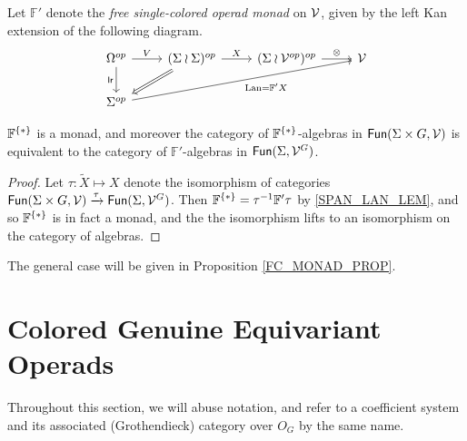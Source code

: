 \documentclass[a4paper,10pt
]{article}%
\renewcommand{\1}{\ensuremath{\mathbb{id}}}
\begin{document}
\begin{notation}[\cite{BP17}]
      Let $\mathbb F'$ denote the \textit{free single-colored operad monad} on $\mathcal V$, given by the left Kan extension of the following diagram.
      \begin{equation}
            \begin{tikzcd}
                  \Omega^{op}
                  \arrow[d, "\mathsf{lr}"']
                  \arrow[r, "V"]
                  &
                  (\Sigma \wr \Sigma)^{op} \arrow[r, "X"]
                  \arrow[dl, Rightarrow]
                  &
                  (\Sigma \wr \V^{op})^{op} \arrow[r, "\otimes"]
                  &
                  \V
                  \\
                  \Sigma^{op} \arrow[urrr, "\Lan = \mathbb F' X"']
            \end{tikzcd}
      \end{equation}
\end{notation}

\begin{proposition}
      \label{TEST_PROP}
      $\mathbb F^{\set{\**}}$ is a monad, and moreover
      the category of $\mathbb F^{\set{\**}}$-algebras in $\mathsf{Fun}(\Sigma \times G, \mathcal V)$ is equivalent to
      the category of $\mathbb F'$-algebras in $\mathsf{Fun}(\Sigma, \mathcal V^G)$.
\end{proposition}
\begin{proof}
      Let $\tau: \tilde X \mapsto X$ denote the isomorphism of categories
      $\mathsf{Fun}(\Sigma \times G, \mathcal V) \xrightarrow{\tau} \mathsf{Fun}(\Sigma, \mathcal V^G)$.
      Then $\mathbb F^{\set{\**}} = \tau^{-1} \mathbb F' \tau$ by \ref{SPAN_LAN_LEM}, and so
      $\mathbb F^{\set{\**}}$ is in fact a monad, and the
      the isomorphism lifts to an isomorphism on the category of algebras.
\end{proof}

The general case will be given in Proposition \ref{FC_MONAD_PROP}.





\newpage

\section{Colored Genuine Equivariant Operads}

Throughout this section, we will abuse notation, and refer to
a coefficient system and its associated (Grothendieck) category over $O_G$ by the same name.
\end{document}
